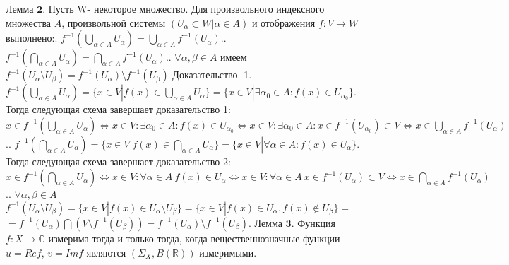 \documentclass[a4paper,14pt]{article}
\begin{document}
$\textbf{Лемма 2.}$ Пусть W- некоторое множество. Для произвольного индексного множества $A$, произвольной системы $(U_{\alpha}\subset W|\alpha\in A)$ и отображения $f:V\rightarrow W$ выполнено:. $f^{-1}(\bigcup\limits_{\alpha\in A} U_{\alpha})=\bigcup\limits_{\alpha\in A} f^{-1}(U_{\alpha})$.. $f^{-1}(\bigcap\limits_{\alpha\in A} U_{\alpha})=\bigcap\limits_{\alpha\in A} f^{-1}(U_{\alpha})$.. $\forall \alpha,\beta\in A$ имеем $f^{-1}(U_{\alpha}\setminus U_{\beta})=f^{-1}(U_{\alpha})\setminus f^{-1}(U_{\beta})$\newline
$\textbf{Доказательство.}$ 1. $f^{-1}(\bigcup\limits_{\alpha\in A} U_{\alpha})=\{x\in V|f(x)\in \bigcup\limits_{\alpha\in A} U_{\alpha}\}=\{x\in V|\exists \alpha_0\in A: f(x)\in U_{\alpha_0}\}$.\newline
Тогда следующая схема завершает доказательство 1:\newline
$x\in f^{-1}(\bigcup\limits_{\alpha\in A} U_{\alpha})\Leftrightarrow x\in V: \exists\alpha_0\in A: f(x)\in U_{\alpha_0}\Leftrightarrow x\in V: \exists\alpha_0\in A: x\in f^{-1}(U_{\alpha_0})\subset V\Leftrightarrow x\in \bigcup\limits_{\alpha\in A} f^{-1}(U_{\alpha})$.. $f^{-1}(\bigcap\limits_{\alpha\in A} U_{\alpha})=\{x\in V|f(x)\in\bigcap\limits_{\alpha\in A} U_{\alpha}\}=\{x\in V|\forall\alpha\in A: f(x)\in U_{\alpha}\}$.\newline
Тогда следующая схема завершает доказательство 2:\newline
$x\in f^{-1}(\bigcap\limits_{\alpha\in A} U_{\alpha})\Leftrightarrow x\in V: \forall\alpha\in A\ f(x)\in U_{\alpha}\Leftrightarrow x\in V: \forall\alpha\in A\ x\in f^{-1}(U_{\alpha})\subset V\Leftrightarrow x\in \bigcap\limits_{\alpha\in A} f^{-1}(U_{\alpha})$.. $\forall \alpha,\beta\in A$ $f^{-1}(U_{\alpha}\setminus U_{\beta})=\{x\in V| f(x)\in U_{\alpha}\setminus U_{\beta}\}= \{x\in V| f(x)\in U_{\alpha}, f(x)\not\in U_{\beta}\}=$\newline
$=f^{-1}(U_{\alpha})\bigcap (V\setminus f^{-1}(U_{\beta}))=f^{-1}(U_{\alpha})\setminus f^{-1}(U_{\beta})$.\newline
$\textbf{Лемма 3.}$ Функция $f:X\rightarrow\mathbb{C}$ измерима тогда и только тогда, когда вещественнозначные функции $u=Ref$, $v=Imf$ являются $(\Sigma_X,B(\mathbb{R}))$-измеримыми.\newline
\end{document}
